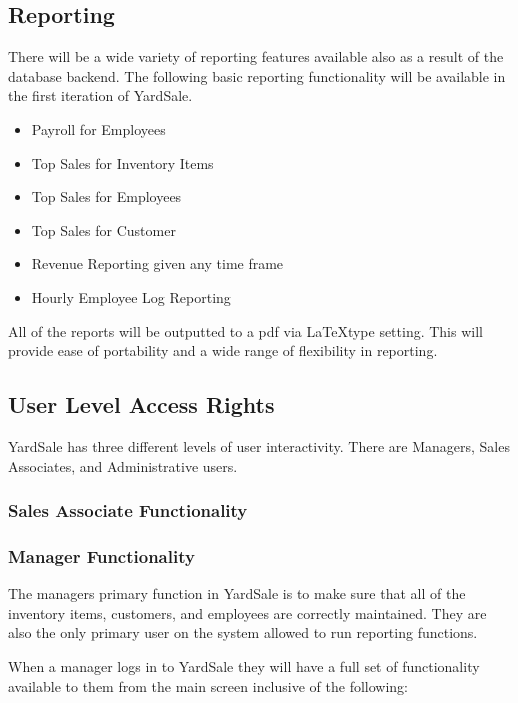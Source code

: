\documentclass{book}
\begin{document}
\subsection{Reporting}

There will be a wide variety of reporting features available also as a result of the database backend. The following basic reporting functionality will be available in the first iteration of YardSale.

\begin{itemize}
\item{Payroll for Employees}
\item{Top Sales for Inventory Items}
\item{Top Sales for Employees}
\item{Top Sales for Customer}
\item{Revenue Reporting given any time frame}
\item{Hourly Employee Log Reporting}
\end{itemize}

All of the reports will be outputted to a pdf via \LaTeX type setting. This will provide ease of portability and a wide range of flexibility in reporting.


\subsection{User Level Access Rights}

YardSale has three different levels of user interactivity. There are Managers, Sales Associates, and Administrative users.

\subsubsection{Sales Associate Functionality}


\subsubsection{Manager Functionality}

The managers primary function in YardSale is to make sure that all of the inventory items, customers, and employees are correctly maintained. They are also the only primary user on the system allowed to run reporting functions.

When a manager logs in to YardSale they will have a full set of functionality available to them from the main screen inclusive of the following:
\end{document}
